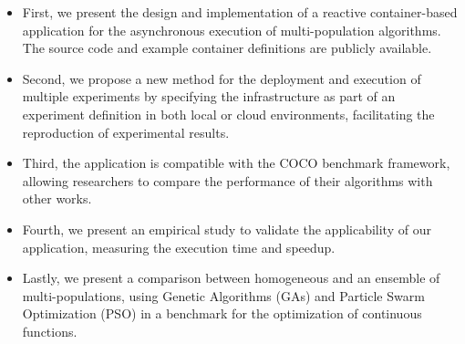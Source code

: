 \documentclass[review]{elsarticle}
\begin{document}
\begin{itemize}
    \item First, we present the design and implementation of a reactive 
    container-based application for the asynchronous execution of multi-population 
    algorithms. The source code and example container definitions are
    publicly available. %
    \item Second, we propose a new method for the deployment and execution of 
    multiple experiments by specifying the infrastructure as part of an 
    experiment definition in both local or cloud environments,
    facilitating the reproduction of experimental results. %
    \item Third, the application is compatible with the COCO benchmark 
    framework, allowing researchers to compare the performance of their 
    algorithms with other works. %
    \item Fourth, we present an empirical study to validate the 
    applicability of our application,  measuring the execution time and  
    speedup.
    
    \item Lastly, we present a comparison between homogeneous and an ensemble of 
    multi-populations, using Genetic Algorithms (GAs) and Particle 
    Swarm Optimization (PSO) in a benchmark for the optimization of 
    continuous functions. %
\end{itemize}
\end{document}

